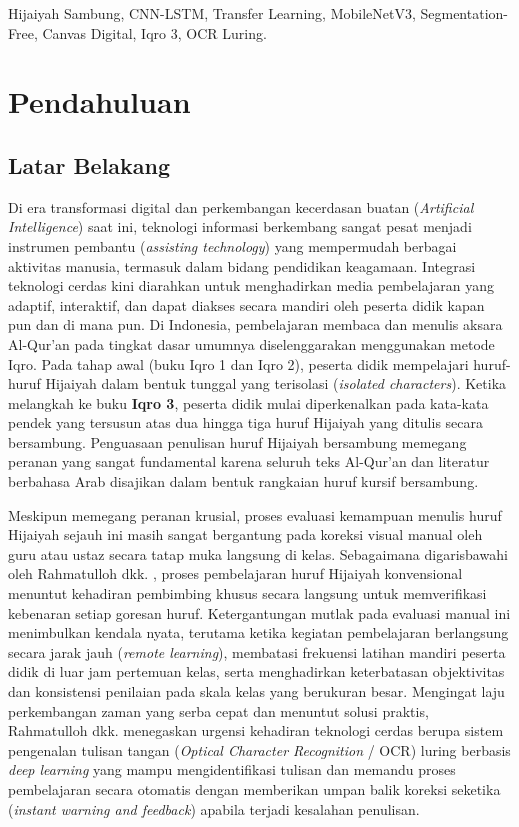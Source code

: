 \documentclass[conference]{IEEEtran}
\begin{document}
\begin{IEEEkeywords}
Hijaiyah Sambung, CNN-LSTM, Transfer Learning, MobileNetV3, Segmentation-Free, Canvas Digital, Iqro 3, OCR Luring.
\end{IEEEkeywords}

\section{Pendahuluan}

\subsection{Latar Belakang}
Di era transformasi digital dan perkembangan kecerdasan buatan (\textit{Artificial Intelligence}) saat ini, teknologi informasi berkembang sangat pesat menjadi instrumen pembantu (\textit{assisting technology}) yang mempermudah berbagai aktivitas manusia, termasuk dalam bidang pendidikan keagamaan. Integrasi teknologi cerdas kini diarahkan untuk menghadirkan media pembelajaran yang adaptif, interaktif, dan dapat diakses secara mandiri oleh peserta didik kapan pun dan di mana pun. Di Indonesia, pembelajaran membaca dan menulis aksara Al-Qur'an pada tingkat dasar umumnya diselenggarakan menggunakan metode Iqro. Pada tahap awal (buku Iqro 1 dan Iqro 2), peserta didik mempelajari huruf-huruf Hijaiyah dalam bentuk tunggal yang terisolasi (\textit{isolated characters}). Ketika melangkah ke buku \textbf{Iqro 3}, peserta didik mulai diperkenalkan pada kata-kata pendek yang tersusun atas dua hingga tiga huruf Hijaiyah yang ditulis secara bersambung. Penguasaan penulisan huruf Hijaiyah bersambung memegang peranan yang sangat fundamental karena seluruh teks Al-Qur'an dan literatur berbahasa Arab disajikan dalam bentuk rangkaian huruf kursif bersambung.

Meskipun memegang peranan krusial, proses evaluasi kemampuan menulis huruf Hijaiyah sejauh ini masih sangat bergantung pada koreksi visual manual oleh guru atau ustaz secara tatap muka langsung di kelas. Sebagaimana digarisbawahi oleh Rahmatulloh dkk. \cite{rahmatulloh2022}, proses pembelajaran huruf Hijaiyah konvensional menuntut kehadiran pembimbing khusus secara langsung untuk memverifikasi kebenaran setiap goresan huruf. Ketergantungan mutlak pada evaluasi manual ini menimbulkan kendala nyata, terutama ketika kegiatan pembelajaran berlangsung secara jarak jauh (\textit{remote learning}), membatasi frekuensi latihan mandiri peserta didik di luar jam pertemuan kelas, serta menghadirkan keterbatasan objektivitas dan konsistensi penilaian pada skala kelas yang berukuran besar. Mengingat laju perkembangan zaman yang serba cepat dan menuntut solusi praktis, Rahmatulloh dkk. \cite{rahmatulloh2022} menegaskan urgensi kehadiran teknologi cerdas berupa sistem pengenalan tulisan tangan (\textit{Optical Character Recognition} / OCR) luring berbasis \textit{deep learning} yang mampu mengidentifikasi tulisan dan memandu proses pembelajaran secara otomatis dengan memberikan umpan balik koreksi seketika (\textit{instant warning and feedback}) apabila terjadi kesalahan penulisan.
\end{document}
